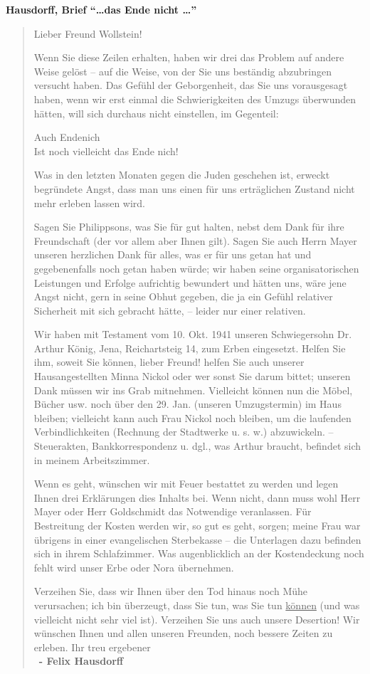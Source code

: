 \textbf{Hausdorff, Brief ``\ldots das Ende nicht \ldots''}
\blockquote{
	Lieber Freund Wollstein!

	Wenn Sie diese Zeilen erhalten, haben wir drei das Problem auf andere Weise gelöst – auf die Weise, von der Sie uns beständig abzubringen versucht haben. Das Gefühl der Geborgenheit, das Sie uns vorausgesagt haben, wenn wir erst einmal die Schwierigkeiten des Umzugs überwunden hätten, will sich durchaus nicht einstellen, im Gegenteil:
	{\center Auch Endenich\\Ist noch vielleicht das Ende nich!\par}

	Was in den letzten Monaten gegen die Juden geschehen ist, erweckt begründete Angst, dass man uns einen für uns erträglichen Zustand nicht mehr erleben lassen wird.

	Sagen Sie Philippsons, was Sie für gut halten, nebst dem Dank für ihre Freundschaft (der vor allem aber Ihnen gilt). Sagen Sie auch Herrn Mayer unseren herzlichen Dank für alles, was er für uns getan hat und gegebenenfalls noch getan haben würde; wir haben seine organisatorischen Leistungen und Erfolge aufrichtig bewundert und hätten uns, wäre jene Angst nicht, gern in seine Obhut gegeben, die ja ein Gefühl relativer Sicherheit mit sich gebracht hätte, – leider nur einer relativen.

	Wir haben mit Testament vom 10. Okt. 1941 unseren Schwiegersohn Dr. Arthur König, Jena, Reichartsteig 14, zum Erben eingesetzt. Helfen Sie ihm, soweit Sie können, lieber Freund! helfen Sie auch unserer Hausangestellten Minna Nickol oder wer sonst Sie darum bittet; unseren Dank müssen wir ins Grab mitnehmen. Vielleicht können nun die Möbel, Bücher usw. noch über den 29. Jan. (unseren Umzugstermin) im Haus bleiben; vielleicht kann auch Frau Nickol noch bleiben, um die laufenden Verbindlichkeiten (Rechnung der Stadtwerke u. s. w.) abzuwickeln. – Steuerakten, Bankkorrespondenz u. dgl., was Arthur braucht, befindet sich in meinem Arbeitszimmer.

	Wenn es geht, wünschen wir mit Feuer bestattet zu werden und legen Ihnen drei Erklärungen dies Inhalts bei. Wenn nicht, dann muss wohl Herr Mayer oder Herr Goldschmidt das Notwendige veranlassen. Für Bestreitung der Kosten werden wir, so gut es geht, sorgen; meine Frau war übrigens in einer evangelischen Sterbekasse – die Unterlagen dazu befinden sich in ihrem Schlafzimmer. Was augenblicklich an der Kostendeckung noch fehlt wird unser Erbe oder Nora übernehmen.

	Verzeihen Sie, dass wir Ihnen über den Tod hinaus noch Mühe verursachen; ich bin ü\-ber\-zeugt, dass Sie tun, was Sie tun \underline{können} (und was vielleicht nicht sehr viel ist). Verzeihen Sie uns auch unsere Desertion! Wir wünschen Ihnen und allen unseren Freunden, noch bessere Zeiten zu erleben.
	{\center Ihr treu ergebener\\}
	\indent~\hfill{\raggedleft \textbf{- Felix Hausdorff}}
}

